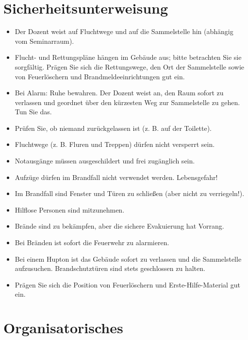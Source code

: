 \documentclass[
  a4paper,
  DIV=11]{scrreprt}
\providecommand{\tightlist}{%
  \setlength{\itemsep}{0pt}\setlength{\parskip}{0pt}}\usepackage{longtable,booktabs,array}
\theoremstyle{definition}
\theoremstyle{definition}
\theoremstyle{remark}
\begin{document}

\hypertarget{sicherheitsunterweisung}{%
\section*{Sicherheitsunterweisung}\label{sicherheitsunterweisung}}


\begin{itemize}
\tightlist
\item
  Der Dozent weist auf Fluchtwege und auf die Sammelstelle hin (abhängig
  vom Seminarraum).
\item
  Flucht- und Rettungspläne hängen im Gebäude aus; bitte betrachten Sie
  sie sorgfältig. Prägen Sie sich die Rettungswege, den Ort der
  Sammelstelle sowie von Feuerlöschern und Brandmeldeeinrichtungen gut
  ein.
\item
  Bei Alarm: Ruhe bewahren. Der Dozent weist an, den Raum sofort zu
  verlassen und geordnet über den kürzesten Weg zur Sammelstelle zu
  gehen. Tun Sie das.
\item
  Prüfen Sie, ob niemand zurückgelassen ist (z. B. auf der Toilette).
\item
  Fluchtwege (z. B. Fluren und Treppen) dürfen nicht versperrt sein.
\item
  Notausgänge müssen ausgeschildert und frei zugänglich sein.
\item
  Aufzüge dürfen im Brandfall nicht verwendet werden. Lebensgefahr!
\item
  Im Brandfall sind Fenster und Türen zu schließen (aber nicht zu
  verriegeln!).
\item
  Hilflose Personen sind mitzunehmen.
\item
  Brände sind zu bekämpfen, aber die sichere Evakuierung hat Vorrang.
\item
  Bei Bränden ist sofort die Feuerwehr zu alarmieren.
\item
  Bei einem Hupton ist das Gebäude sofort zu verlassen und die
  Sammelstelle aufzusuchen. Brandschutztüren sind stets geschlossen zu
  halten.
\item
  Prägen Sie sich die Position von Feuerlöschern und
  Erste-Hilfe-Material gut ein.
\end{itemize}

\hypertarget{organisatorisches}{%
\section*{Organisatorisches}\label{organisatorisches}}
\end{document}
